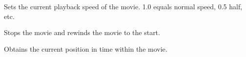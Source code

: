 
Sets the current playback speed of the movie. 1.0 equals normal speed, 0.5 half, etc.


\label{wxmoviectrlstop}


Stops the movie and rewinds the movie to the start.


\label{wxmoviectrltell}


Obtains the current position in time within the movie.
